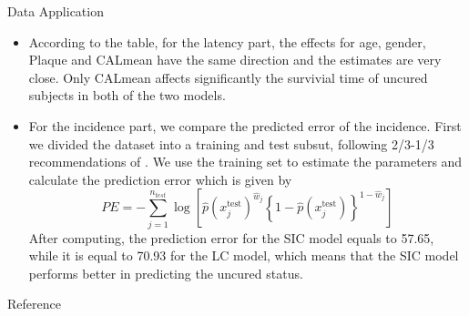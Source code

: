 \documentclass[10 pt]{beamer}
\begin{document}
\begin{frame}{Data Application}
	
	\begin{itemize}
		\item According to the table, for the latency part, the effects for age, gender, Plaque and CALmean have the same direction and the estimates are very close. Only CALmean affects significantly the survivial time of uncured subjects in both of the two models.
		\item For the incidence part, we compare the predicted error of the incidence. First we divided the dataset into a training and test subsut, following 2/3-1/3 recommendations of \cite{Hastie2009}. We use the training set to estimate the parameters and calculate the prediction error which is given by
		\begin{equation}\label{equ:PE}
			PE =-\sum_{j=1}^{n_{test}} \log \left[\hat{p}\left({x}_{j}^{\text {test}}\right)^{\hat{w}_{j}}\left\{1-\hat{p}\left({x}_{j}^{\text {test}}\right)\right\}^{1-\hat{w}_{j}}\right]
		\end{equation}
		After computing, the prediction error for the SIC model equals to 57.65, while it is equal to 70.93 for the LC model, which means that the SIC model performs better in predicting the uncured status.
	\end{itemize}
\end{frame}

\begin{frame}{Reference}
	
	
\end{frame}
\end{document}
